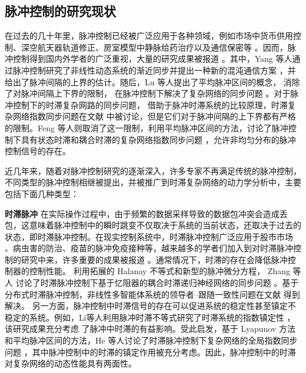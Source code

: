 \subsection{脉冲控制的研究现状}
在过去的几十年里，脉冲控制已经被广泛应用于各种领域，例如市场中货币供用控制、深空航天器轨道修正、房室模型中静脉给药治疗以及通信保密等 \cite{haddad2006impulsive,goedel2012hybrid}。因而，脉冲控制得到国内外学者的广泛重视，大量的研究成果被报道 \cite{yang1997impulsive645,lu2010unified1215,wang2018unified25,lu2012pinning1250176,sun2012outer1751,feng2016exponential621}。其中，Yang 等人通过脉冲控制研究了非线性动态系统的渐近同步并提出一种新的混沌通信方案 \cite{yang1997impulsive645}，并给出了脉冲间隔的上界的估计。随后，Lu 等人提出了平均脉冲区间的概念， 消除了对脉冲间隔上下界的限制， 在脉冲控制下解决了复杂网络的同步问题 \cite{lu2010unified1215}。对于脉冲控制下的时滞复杂网路的同步问题， 借助于脉冲时滞系统的比较原理，时滞复杂网络指数同步问题在文献 \cite{lu2012pinning1250176,sun2012outer1751} 中被讨论，但是它们对于脉冲间隔的上下界都有严格的限制。Feng 等人则取消了这一限制，利用平均脉冲区间的方法，讨论了脉冲控制下具有状态时滞和耦合时滞的复杂网络指数同步问题 \cite{feng2016exponential621}，允许非均匀分布的脉冲控制信号的存在。
  

近几年来，随着对脉冲控制研究的逐渐深入，许多专家不再满足传统的脉冲控制，不同类型的脉冲控制相继被提出，并被推广到时滞复杂网络的动力学分析中，主要包括下面几种类型：


 \textbf{ 时滞脉冲}  在实际操作过程中，由于频繁的数据采样导致的数据包冲突会造成丢包，这意味着脉冲控制中的瞬时跳变不仅取决于系统的当前状态，还取决于过去的状态，即时滞脉冲控制。在现实控制系统中，时滞脉冲控制广泛应用于股市市场
 、病虫害的防治、疫苗的脉冲免疫接种等，越来越多的学者们加入到对时滞脉冲控制的研究中来，许多重要的成果被报道 \cite{liu2018consensus134,Li2016Stabilization,Zhang2015Synchronizationof,Li2016Stability,He2017Network,Yang2018Review,he2020synchronization}。通常情况下，时滞的存在会降低脉冲控制器的控制性能。 
 利用拓展的 Halanay 不等式和新型的脉冲微分方程， Zhang 等人  讨论了时滞脉冲控制下基于忆阻器的耦合时滞递归神经网络的同步问题 \cite{Zhang2015Synchronizationof}。基于分布式时滞脉冲控制，非线性多智能体系统的领导者--跟随一致性问题在文献 \cite{He2017Network} 得到解决。 另一方面，脉冲控制中时滞信号的存在可以促进系统的稳定性甚至镇定不稳定的系统。例如，Li等人利用脉冲时滞不等式研究了时滞系统的指数镇定性 \cite{Li2016Stabilization} ， 该研究成果充分考虑
了脉冲中时滞的有益影响。受此启发，基于 Lyapunov 方法和平均脉冲区间的方法，He 等人讨论了时滞脉冲控制下复杂网络的全局指数同步问题 \cite{he2020synchronization}，其中脉冲控制中的时滞的镇定作用被充分考虑。因此，脉冲控制中的时滞对复杂网络的动态性能具有两面性。

